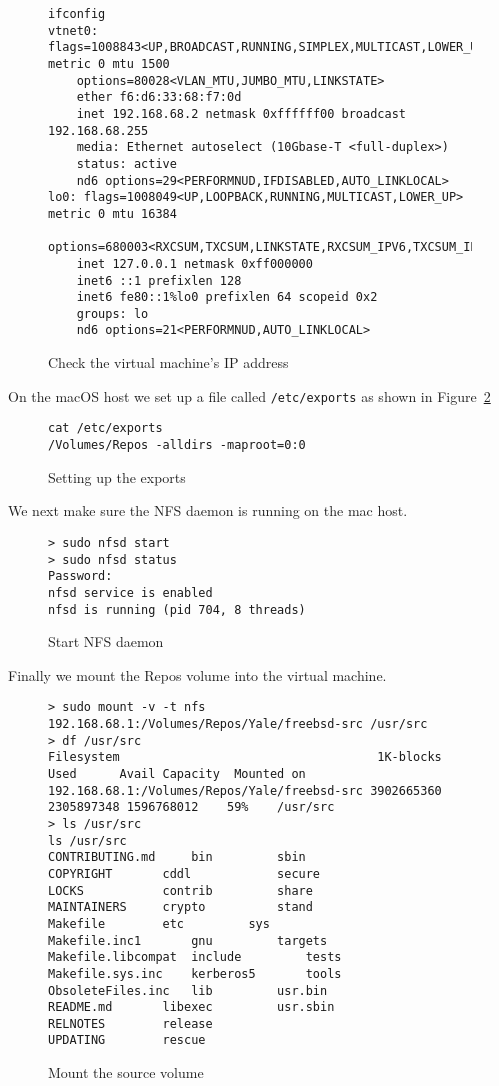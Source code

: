 \begin{figure}
  \centering
\begin{verbatim}
ifconfig
vtnet0: flags=1008843<UP,BROADCAST,RUNNING,SIMPLEX,MULTICAST,LOWER_UP> metric 0 mtu 1500
	options=80028<VLAN_MTU,JUMBO_MTU,LINKSTATE>
	ether f6:d6:33:68:f7:0d
	inet 192.168.68.2 netmask 0xffffff00 broadcast 192.168.68.255
	media: Ethernet autoselect (10Gbase-T <full-duplex>)
	status: active
	nd6 options=29<PERFORMNUD,IFDISABLED,AUTO_LINKLOCAL>
lo0: flags=1008049<UP,LOOPBACK,RUNNING,MULTICAST,LOWER_UP> metric 0 mtu 16384
	options=680003<RXCSUM,TXCSUM,LINKSTATE,RXCSUM_IPV6,TXCSUM_IPV6>
	inet 127.0.0.1 netmask 0xff000000
	inet6 ::1 prefixlen 128
	inet6 fe80::1%lo0 prefixlen 64 scopeid 0x2
	groups: lo
	nd6 options=21<PERFORMNUD,AUTO_LINKLOCAL>
\end{verbatim}
  \caption{Check the virtual machine's IP address}
  \label{fig:utm-fbsd-checkip}
\end{figure}

On the macOS host we set up a file called \verb|/etc/exports| as shown
in Figure~\ref{fig:utm-mac-exports}

\begin{figure}
  \centering
\begin{verbatim}
cat /etc/exports
/Volumes/Repos -alldirs -maproot=0:0
\end{verbatim}
  \caption{Setting up the exports}
  \label{fig:utm-mac-exports}
\end{figure}

We next make sure the NFS daemon is running on the mac host.

\begin{figure}
  \centering
\begin{verbatim}
> sudo nfsd start
> sudo nfsd status
Password:
nfsd service is enabled
nfsd is running (pid 704, 8 threads)
\end{verbatim}
  \caption{Start NFS daemon}
  \label{fig:utm-mac-nfsd}
\end{figure}

Finally we mount the Repos volume into the virtual machine.

\begin{figure}
  \centering
\begin{verbatim}
> sudo mount -v -t nfs 192.168.68.1:/Volumes/Repos/Yale/freebsd-src /usr/src
> df /usr/src
Filesystem                                    1K-blocks       Used      Avail Capacity  Mounted on
192.168.68.1:/Volumes/Repos/Yale/freebsd-src 3902665360 2305897348 1596768012    59%    /usr/src
> ls /usr/src
ls /usr/src
CONTRIBUTING.md		bin			sbin
COPYRIGHT		cddl			secure
LOCKS			contrib			share
MAINTAINERS		crypto			stand
Makefile		etc			sys
Makefile.inc1		gnu			targets
Makefile.libcompat	include			tests
Makefile.sys.inc	kerberos5		tools
ObsoleteFiles.inc	lib			usr.bin
README.md		libexec			usr.sbin
RELNOTES		release
UPDATING		rescue
\end{verbatim}
  \caption{Mount the source volume}
  \label{fig:utm-fbsd-mount}
\end{figure}

